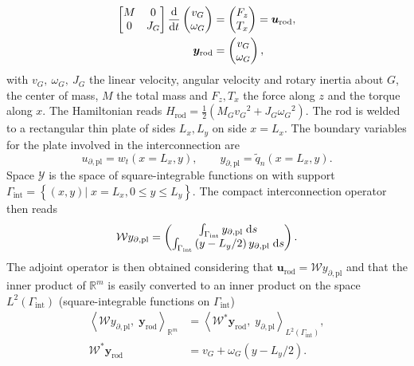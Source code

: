 \documentclass[letterpaper, 10 pt, conference]{ieeeconf}
\begin{document}
\begin{equation}
\begin{aligned}
\begin{bmatrix}
M & 0 \\
0   & J_G \\
\end{bmatrix} 
\displaystyle \diff{}{t}
\begin{pmatrix}
v_G \\ \omega_G \\
\end{pmatrix} & = \begin{pmatrix}
F_z \\ T_x \\
\end{pmatrix} = \bm{u}_{\text{rod}}\vspace{1mm}, \\
\bm{y}_{\text{rod}} &= \begin{pmatrix}
v_G \\ \omega_{G} \\
\end{pmatrix},
\end{aligned}
\end{equation}
with $v_G, \ \omega_{G}, \ J_G$ the linear velocity, angular velocity and rotary inertia about $G$, the center of mass, $M$ the total mass  and $F_z, T_x$ the force along $z$ and the torque along $x$. The Hamiltonian reads $H_{\text{rod}}  = \frac{1}{2} \left(M_G {v_G}^2 + J_G {\omega_G}^2 \right)$. The rod is welded to a rectangular thin plate of sides $L_x, L_y$ on side $x = L_x$. The boundary variables for the plate involved in the interconnection are 
\[u_{\partial, \text{pl}} = w_t(x = L_x, y),  \qquad  y_{\partial, \text{pl}} = \widetilde{q}_n(x = L_x, y).
\]
Space $\mathscr{Y}$ is the space of square-integrable functions on with support $\Gamma_{\text{int}} = \left\{ (x,y) \vert \; x=L_x, 0 \le y \le L_y  \right\}$. The compact interconnection operator then reads
\begin{equation}
\mathcal{W} y_{\partial, \text{pl}} = \begin{pmatrix}
\int_{\Gamma_{\text{int}}} y_{\partial, \text{pl}} \d{s} \\
\int_{\Gamma_{\text{int}}} \left( y - L_y/2 \right) y_{\partial, \text{pl}} \d{s} \\
\end{pmatrix}.
\end{equation}
The adjoint operator is then obtained considering that $\bm{u}_{\text{rod}} = \mathcal{W} y_{\partial, \text{pl}}$ and that the inner product of $\mathbb{R}^m$ is easily converted to an inner product on the space $L^2(\Gamma_{\text{int}})$ (square-integrable functions on $\Gamma_{\text{int}}$)
\begin{align*}
\left\langle \mathcal{W} y_{\partial, \text{pl}}, \; \bm{y}_{\text{rod}} \right\rangle_{\mathbb{R}^m} &= \left\langle \mathcal{W}^* \bm{y}_{\text{rod}} , \; y_{\partial, \text{pl}} \right\rangle_{L^2(\Gamma_{\text{int}})}, \\
\mathcal{W}^* \bm{y}_{\text{rod}} &= v_G + \omega_{G} \left( y - L_y/2 \right).
\end{align*}
\end{document}
